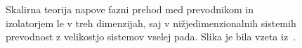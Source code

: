 \begin{minipage}[t]{0.5\textwidth}
\begin{figure}[H]
\caption{Skalirna teorija napove fazni prehod med prevodnikom in izolatorjem le v treh dimenzijah, saj v nižjedimenzionalnih sistemih prevodnost z velikostjo sistemov vselej pada. Slika je bila vzeta iz~\cite{lagendijk2009fifty}.}
\label{fig:scalingtheory} 
\end{figure}
\end{minipage}\\\\
\vspace{1cm}
